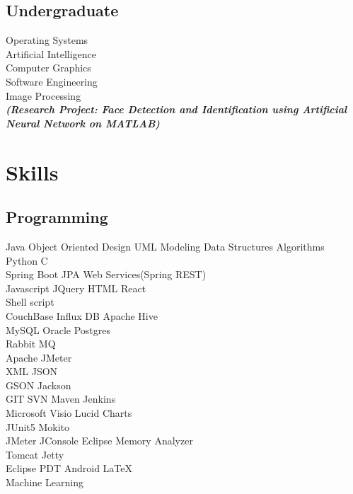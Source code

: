 \documentclass[]{kushal-resume}
\begin{document}
\begin{minipage}[t]{0.33\textwidth}
\subsection{Undergraduate}
Operating Systems \\
Artificial Intelligence  \\
Computer Graphics  \\
Software Engineering \\
Image Processing \\
{\footnotesize \textit{\textbf{(Research Project: Face Detection and Identification using Artificial Neural Network on MATLAB) }}} \\
\sectionsep


\section{Skills}
\subsection{Programming}
Java \textbullet{} Object Oriented Design  \textbullet{} UML Modeling \textbullet{} Data Structures \textbullet{} Algorithms \\

Python \textbullet{} C \\ 

Spring Boot \textbullet{} JPA \textbullet{} Web Services(Spring REST) \\
Javascript \textbullet{} JQuery \textbullet{} HTML \textbullet{} React \\
Shell script \\
CouchBase \textbullet{} Influx DB \textbullet{} Apache Hive \\
MySQL \textbullet{} Oracle \textbullet{} Postgres \\
Rabbit MQ \\
Apache JMeter \\
XML \textbullet{} JSON \\
GSON \textbullet{} Jackson \\
GIT \textbullet{} SVN \textbullet{} Maven \textbullet{} Jenkins \\
Microsoft Visio \textbullet{} Lucid Charts \\
JUnit5 \textbullet{} Mokito \\
JMeter \textbullet{} JConsole \textbullet{} Eclipse Memory Analyzer \\
Tomcat \textbullet{} Jetty \\
Eclipse PDT \textbullet{} Android \textbullet{} \LaTeX \\
Machine Learning \\
\sectionsep



%
%

\end{minipage} 
\end{document}
